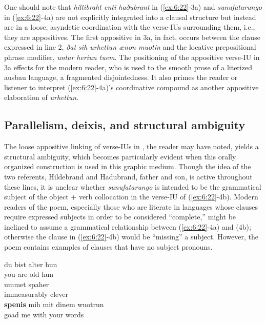 \noindent One should note that \textit{hiltibraht enti haðubrant} in (\ref{ex:6:22}-3a) and \textit{sunufatarungo} in (\ref{ex:6:22}-4a) are not explicitly integrated into a clausal structure but instead are in a loose, asyndetic coordination with the verse-IUs surrounding them, i.e., they are appositives. The first appositive in 3a, in fact, occurs between the clause expressed in line 2, \textit{ðat sih urhettun ænon muotin} and the locative prepositional phrase modifier, \textit{untar heriun tuem}. The positioning of the appositive verse-IU in 3a effects for the modern reader, who is used to the smooth prose of a literized ausbau language, a fragmented disjointedness. It also primes the reader or listener to interpret (\ref{ex:6:22}-4a)’s coordinative compound as another appositive elaboration of \textit{urhettun}.

\subsection{Parallelism, deixis, and structural ambiguity}\label{sec:6.2.3}
\begin{sloppypar}
The loose appositive linking of verse-IUs in , the reader may have noted, yields a structural ambiguity, which becomes particularly evident when this orally organized construction is used in this graphic medium. Though the idea of the two referents, Hildebrand and Hadubrand, father and son, is active throughout these lines, it is unclear whether \textit{sunufatarungo} is intended to be the grammatical subject of the object + verb collocation in the verse-IU of (\ref{ex:6:22}-4b). Modern readers of the poem, especially those who are literate in languages whose clauses require expressed subjects in order to be considered “complete,” might be inclined to assume a grammatical relationship between (\ref{ex:6:22}-4a) and (4b); otherwise the clause in (\ref{ex:6:22}-4b) would be “missing” a subject. However, the poem contains examples of clauses that have no subject pronouns.
\end{sloppypar}

\ea%
    \label{ex:6:23}
\ea
\gll du  bist  alter  hun\\
  you  are  old    hun\\

\gll ummet       spaher\\
immeasurably  clever\\

\gll  \textbf{spenis}  mih  mit     dinem  wuotrun\\
goad  me  with  your  words\\

